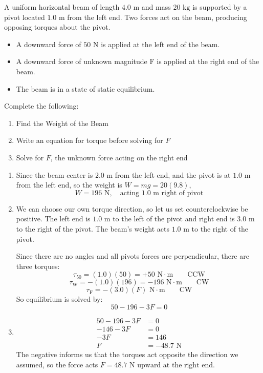 \begin{Exercise}[title=Opposing Torques on a Beam, label=opptorque]
A uniform horizontal beam of length $4.0 \text{ m}$ and mass $20 \text{ kg}$ is supported by a pivot located $1.0 \text{ m}$ from the left end. Two forces act on the beam, producing opposing torques about the pivot.
\begin{itemize}
  \item A downward force of $50 \text{ N}$ is applied at the left end of the beam.
  \item A downward force of unknown magnitude $\text{F}$ is applied at the right end of the beam.
  \item The beam is in a state of static equilibrium.
\end{itemize}

Complete the following:
\begin{enumerate}
  \item Find the Weight of the Beam
  \item Write an equation for torque before solving for $F$
  \item Solve for $F$, the unknown force acting on the right end
\end{enumerate}
\end{Exercise}
\begin{Answer}[ref=opptorque]
\begin{enumerate}
  \item Since the beam center is $2.0 \text{ m}$ from the left end, and the pivot is at $1.0 \text{ m}$ from the left end, so the weight is $W= mg = 20(9.8)$,
  $$W = 196\text{ N},\quad \text{acting } 1.0\text{ m right of pivot}$$
  \item We can choose our own torque direction, so let us set counterclockwise be positive. The left end is $1.0\text{ m}$ to the left of the pivot and right end is $3.0\text{ m}$ to the right of the pivot. The beam's weight acts $1.0\text{ m}$ to the right of the pivot.
  
  Since there are no angles and all pivots forces are perpendicular, there are three torques:
  $$\tau_\text{50} = (1.0)(50) = +50 \text{ N} \cdot \text{m}\qquad\text{CCW}$$
  $$\tau_\text{W} = -(1.0)(196) = -196 \text{ N} \cdot \text{m}\qquad\text{CW}$$
  $$\tau_\text{F} = -(3.0)(F) \text{ N} \cdot \text{m}\qquad\text{CW}$$
  So equilibrium is solved by:
  $$50 - 196 - 3F = 0$$
  \item 
  \begin{align*}
    50 - 196 - 3F &= 0 \\
    -146 - 3F &= 0 \\
    -3F &= 146 \\
    F &= -48.7 \text{ N}
  \end{align*}
  The negative informs us that the torques act opposite the direction we assumed, so the force acts $F = 48.7\text{ N upward at the right end}$. 
\end{enumerate}
\end{Answer}

